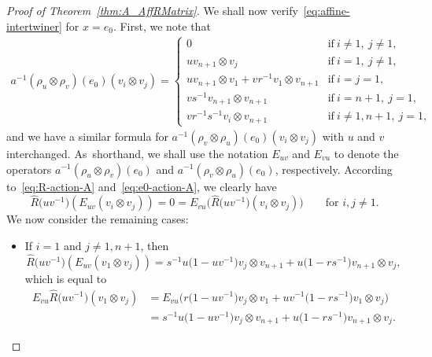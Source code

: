 \documentclass[pdftex]{sigma}
\numberwithin{equation}{section}
\begin{document}
\begin{proof}[Proof of Theorem~\ref{thm:A_AffRMatrix}]
We shall now verify~\eqref{eq:affine-intertwiner} for $x = e_{0}$. First, we note that
\begin{gather}\label{eq:e0-action-A}
 a^{-1}(\rho_{u} \otimes \rho_{v})(e_{0})(v_{i} \otimes v_{j}) =
 \begin{cases}
 0 & \text{if}\ i \neq 1,\ j \neq 1, \\
 u v_{n+1} \otimes v_{j} & \text{if}\ i = 1,\ j \neq 1, \\
 u v_{n+1} \otimes v_{1} + vr^{-1} v_{1} \otimes v_{n+1} & \text{if}\ i = j = 1, \\
 vs^{-1} v_{n+1} \otimes v_{n+1} & \text{if}\ i = n + 1,\ j = 1 ,\\
 vr^{-1}s^{-1} v_{i} \otimes v_{n+1} & \text{if}\ i \neq 1,n+1,\ j = 1,
 \end{cases}
\end{gather}
and we have a similar formula for $a^{-1}(\rho_{v} \otimes \rho_{u})(e_{0})(v_{i} \otimes v_{j})$ with $u$ and $v$ interchanged. As~short\-hand, we shall use the notation $E_{uv}$ and $E_{vu}$ to denote the operators $a^{-1}(\rho_{u} \otimes \rho_{v})(e_{0})$ and $a^{-1}(\rho_{v} \otimes \rho_{u})(e_{0})$, respectively. According to~\eqref{eq:R-action-A} and~\eqref{eq:e0-action-A}, we clearly have
\[
\hat{R}\bigl(uv^{-1}\bigr)(E_{uv}(v_{i} \otimes v_{j})) = 0 =  E_{vu}\bigl(\hat{R}\bigl(uv^{-1}\bigr)(v_{i} \otimes v_{j})\bigr)
\qquad \text{for $i,j \neq 1$.}
\]
 We now consider the remaining cases:
\begin{itemize}\itemsep=0pt
\item
If $i = 1$ and $j \neq 1,n+1$, then
\begin{displaymath}
 \hat{R}\bigl(uv^{-1}\bigr)(E_{uv}(v_{1} \otimes v_{j})) =
 s^{-1}u\bigl(1 - uv^{-1}\bigr)v_{j} \otimes v_{n+ 1} + u\bigl(1 - rs^{-1}\bigr)v_{n+1} \otimes v_{j},
\end{displaymath}
which is equal to
\begin{displaymath}
\begin{split}
 E_{vu}\hat{R}\bigl(uv^{-1}\bigr)(v_{1} \otimes v_{j})
 & = E_{vu}\bigl(r\bigl(1 - uv^{-1}\bigr)v_{j} \otimes v_{1} + uv^{-1}\bigl(1 - rs^{-1}\bigr)v_{1} \otimes v_{j}\bigr) \\
 & = s^{-1}u\bigl(1 - uv^{-1}\bigr)v_{j} \otimes v_{n + 1} + u\bigl(1 - rs^{-1}\bigr)v_{n+1} \otimes v_{j}.
\end{split}
\end{displaymath}


\end{itemize}
\end{proof}
\end{document}
